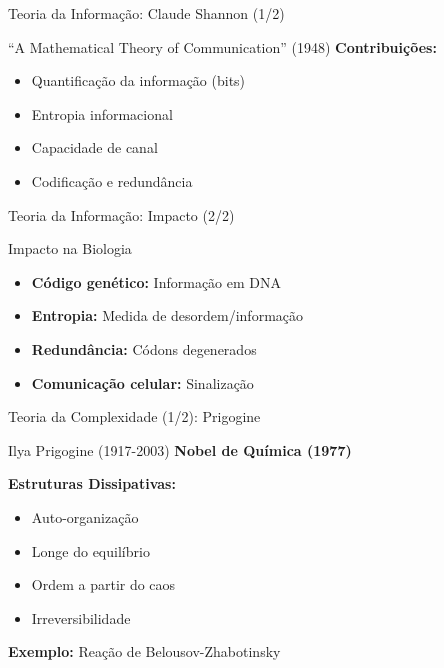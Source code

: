\begin{frame}{Teoria da Informação: Claude Shannon (1/2)}
\begin{block}{``A Mathematical Theory of Communication'' (1948)}
\textbf{Contribuições:}
\begin{itemize}
    \item Quantificação da informação (bits)
    \item Entropia informacional
    \item Capacidade de canal
    \item Codificação e redundância
\end{itemize}
\end{block}
\end{frame}

\begin{frame}{Teoria da Informação: Impacto (2/2)}
\begin{exampleblock}{Impacto na Biologia}
\begin{itemize}
    \item \textbf{Código genético:} Informação em DNA
    \item \textbf{Entropia:} Medida de desordem/informação
    \item \textbf{Redundância:} Códons degenerados
    \item \textbf{Comunicação celular:} Sinalização
\end{itemize}
\end{exampleblock}

\vspace{0.3cm}

\end{frame}

\begin{frame}{Teoria da Complexidade (1/2): Prigogine}
\begin{block}{Ilya Prigogine (1917-2003)}
\textbf{Nobel de Química (1977)}

\vspace{0.2cm}

\textbf{Estruturas Dissipativas:}
\begin{itemize}
    \item Auto-organização
    \item Longe do equilíbrio
    \item Ordem a partir do caos
    \item Irreversibilidade
\end{itemize}

\vspace{0.2cm}
\textbf{Exemplo:} Reação de Belousov-Zhabotinsky
\end{block}
\end{frame}

